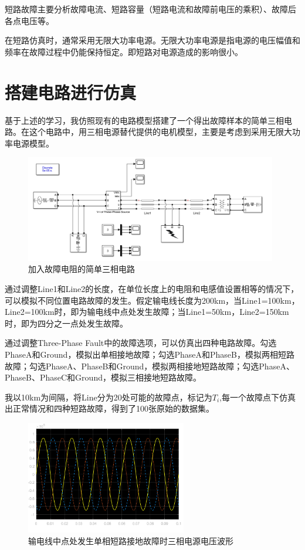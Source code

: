\documentclass{article}
\begin{document}
{	短路故障主要分析故障电流、短路容量（短路电流和故障前电压的乘积）、故障后各点电压等。
	
	在短路仿真时，通常采用无限大功率电源。无限大功率电源是指电源的电压幅值和频率在故障过程中仍能保持恒定。即短路对电源造成的影响很小。
	
	\section{搭建电路进行仿真}
	
	基于上述的学习，我仿照现有的电路模型搭建了一个得出故障样本的简单三相电路。在这个电路中，用三相电源替代提供的电机模型，主要是考虑到采用无限大功率电源模型。
	
	\begin{figure}[h]
		\centering
		\includegraphics[width=11cm]{figure/three_phase_vary.png}
		\caption{加入故障电阻的简单三相电路}
	\end{figure}
	
	通过调整Line1和Line2的长度，在单位长度上的电阻和电感值设置相等的情况下，可以模拟不同位置电路故障的发生。假定输电线长度为200km，当Line1=100km，Line2=100km时，即为输电线中点处发生故障；当Line1=50km，Line2=150km时，即为四分之一点处发生故障。
	
	通过调整Three-Phase Fault中的故障选项，可以仿真出四种电路故障。勾选PhaseA和Ground，模拟出单相接地故障；勾选PhaseA和PhaseB，模拟两相短路故障；勾选PhaseA、PhaseB和Ground，模拟两相接地短路故障；勾选PhaseA、PhaseB、PhaseC和Ground，模拟三相接地短路故障。
	
	我以10km为间隔，将Line分为20处可能的故障点，标记为$T_{i}$,每一个故障点下仿真出正常情况和四种短路故障，得到了100张原始的数据集。
	
	\begin{figure}[h]
		\centering
		\includegraphics[width=7cm]{figure/Us.png}
		\caption{输电线中点处发生单相短路接地故障时三相电源电压波形}
	\end{figure}

}
\end{document}
